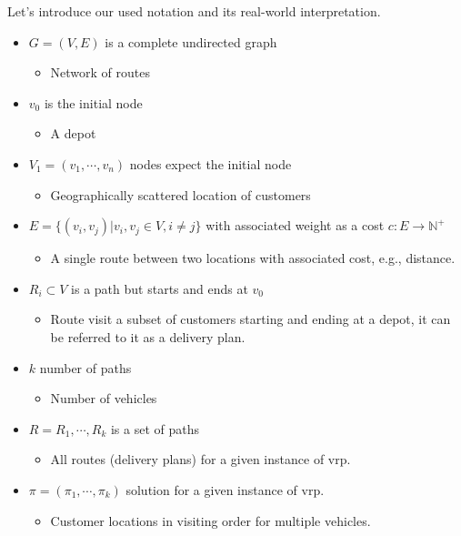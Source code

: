     Let's introduce our used notation and its real-world interpretation.
    \begin{itemize}
        \item $G=(V,E)$ is a complete undirected graph
        \begin{itemize}
            \item Network of routes
        \end{itemize}
        \item $v_0$ is the initial node
        \begin{itemize}
            \item A depot
        \end{itemize}
        \item $V_1 = (v_1, \cdots, v_n)$ nodes expect the initial node
        \begin{itemize}
            \item Geographically scattered location of customers
        \end{itemize}
        \item $E = \{(v_i, v_j)| v_i, v_j \in V, i \neq j\}$ with associated weight as a cost $c: E \to \mathbb{N}^+$
        \begin{itemize}
            \item A single route between two locations with associated cost, e.g., distance.
        \end{itemize}
        \item $R_i \subset V$ is a path but starts and ends at $v_0$
        \begin{itemize}
            \item Route visit a subset of customers starting and ending at a depot, it can be referred to it as a delivery plan.
        \end{itemize}
        \item $k$ number of paths
        \begin{itemize}
            \item Number of vehicles
        \end{itemize}
        \item $R = R_1, \cdots, R_k$ is a set of paths
        \begin{itemize}
            \item All routes (delivery plans) for a given instance of \gls{vrp}.
        \end{itemize}
        \item $\pi = (\pi_1, \cdots, \pi_k)$ solution for a given instance of \gls{vrp}.
        \begin{itemize}
            \item Customer locations in visiting order for multiple vehicles.
        \end{itemize}
    \end{itemize}
    
